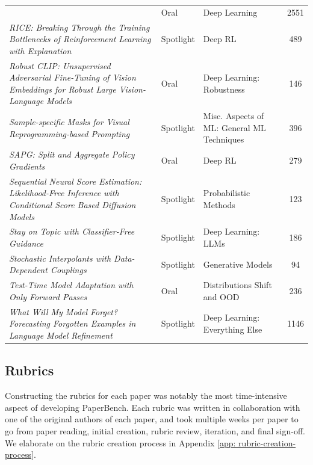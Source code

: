 \documentclass{article}
\theoremstyle{plain}
\theoremstyle{definition}
\theoremstyle{remark}
\begin{document}
\begin{table}[h]
\begin{small}
\begin{tabular}{%
  m{11cm}           %
  m{1.3cm}         %
  m{3cm}<{\raggedright}  %
  c                %
}
   & Oral 
   & Deep Learning 
   & 2551 \\
\emph{RICE: Breaking Through the Training Bottlenecks of Reinforcement Learning with Explanation} 
   & Spotlight 
   & Deep RL 
   & 489 \\
\emph{Robust CLIP: Unsupervised Adversarial Fine-Tuning of Vision Embeddings for Robust Large Vision-Language Models} 
   & Oral 
   & Deep Learning: Robustness 
   & 146 \\
\emph{Sample-specific Masks for Visual Reprogramming-based Prompting} 
   & Spotlight 
   & Misc. Aspects of ML: General ML Techniques 
   & 396 \\
\emph{SAPG: Split and Aggregate Policy Gradients} 
   & Oral 
   & Deep RL 
   & 279 \\
\emph{Sequential Neural Score Estimation: Likelihood-Free Inference with Conditional Score Based Diffusion Models} 
   & Spotlight 
   & Probabilistic Methods 
   & 123 \\
\emph{Stay on Topic with Classifier-Free Guidance}
   & Spotlight 
   & Deep Learning: LLMs 
   & 186 \\
\emph{Stochastic Interpolants with Data-Dependent Couplings}
   & Spotlight 
   & Generative Models
   & 94 \\
\emph{Test-Time Model Adaptation with Only Forward Passes}
   & Oral 
   & Distributions Shift and OOD 
   & 236 \\
\emph{What Will My Model Forget? Forecasting Forgotten Examples in Language Model Refinement} 
   & Spotlight 
   & Deep Learning: Everything Else 
   & 1146 \\
\bottomrule
\end{tabular}
\end{small}
\end{table}


\subsection{Rubrics}
\label{sec:rubrics}

Constructing the rubrics for each paper was notably the most time-intensive aspect of developing PaperBench. Each rubric was written in collaboration with one of the original authors of each paper, and took multiple weeks per paper to go from paper reading, initial creation, rubric review, iteration, and final sign-off. We elaborate on the rubric creation process in Appendix \ref{app: rubric-creation-process}.
\end{document}
